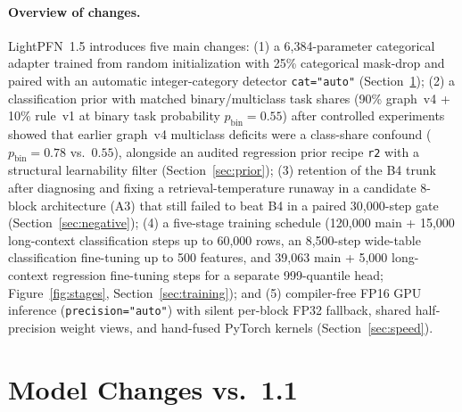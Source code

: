 \documentclass[11pt]{article}
\begin{document}
\paragraph{Overview of changes.}
LightPFN~1.5 introduces five main changes:
(1) a 6,384-parameter categorical adapter trained from random initialization with 25\% categorical mask-drop and paired with an automatic integer-category detector \texttt{cat="auto"} (Section~\ref{sec:model}); %
(2) a classification prior with matched binary/multiclass task shares (90\% graph~v4 + 10\% rule~v1 at binary task probability $p_{\mathrm{bin}}=0.55$) after controlled experiments showed that earlier graph~v4 multiclass deficits were a class-share confound ($p_{\mathrm{bin}}=0.78$ vs.\ $0.55$), alongside an audited regression prior recipe \texttt{r2} with a structural learnability filter (Section~\ref{sec:prior}); %
(3) retention of the B4 trunk after diagnosing and fixing a retrieval-temperature runaway in a candidate 8-block architecture (A3) that still failed to beat B4 in a paired 30,000-step gate (Section~\ref{sec:negative}); %
(4) a five-stage training schedule (120,000 main + 15,000 long-context classification steps up to 60,000 rows, an 8,500-step wide-table classification fine-tuning up to 500 features, and 39,063 main + 5,000 long-context regression fine-tuning steps for a separate 999-quantile head; Figure~\ref{fig:stages}, Section~\ref{sec:training}); %
and (5) compiler-free FP16 GPU inference (\texttt{precision="auto"}) with silent per-block FP32 fallback, shared half-precision weight views, and hand-fused PyTorch kernels (Section~\ref{sec:speed}). %

\section{Model Changes vs.\ 1.1}
\label{sec:model}
\end{document}
